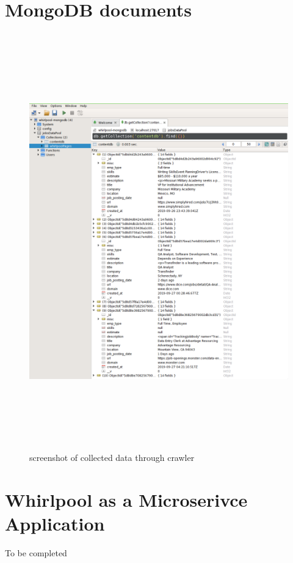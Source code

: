\section{MongoDB documents}
\begin{figure}[h!]
  \centering
  \includegraphics[width=12cm,height=18cm,keepaspectratio]{../media/crawler/collecteddata.png}
  \caption{screenshot of collected data through crawler}
  \label{fig:mongo_data}
\end{figure}
\pagebreak


\pagebreak

\section{Whirlpool as a Microserivce Application}
To be completed

\pagebreak